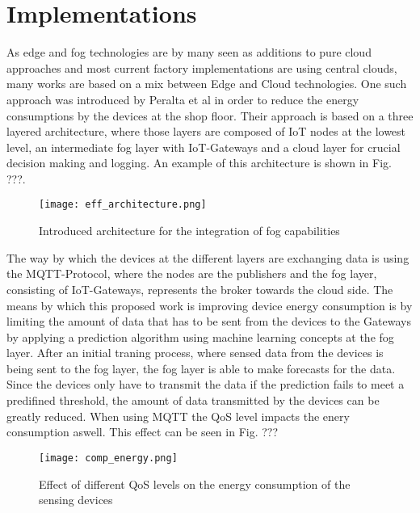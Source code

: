 \section{Implementations}\label{sec:Implementation}

As edge and fog technologies are by many seen as additions to pure cloud approaches and most current factory implementations are using central clouds, many works are based on a mix between Edge and Cloud technologies. One such approach was introduced by Peralta et al in order to reduce the energy consumptions by the devices at the shop floor. Their approach is based on a three layered architecture, where those layers are composed of IoT nodes at the lowest level, an intermediate fog layer with IoT-Gateways and a cloud layer for crucial decision making and logging. An example of this architecture is shown in Fig. ???. 

\begin{figure}
	\centering
	\texttt{[image: eff\_architecture.png]}
	\caption{Introduced architecture for the integration of fog capabilities}
\end{figure}  

The way by which the devices at the different layers are exchanging data is using the MQTT-Protocol, where the nodes are the publishers and the fog layer, consisting of IoT-Gateways, represents the broker towards the cloud side. The means by which this proposed work is improving device energy consumption is by limiting the amount of data that has to be sent from the devices to the Gateways by applying a prediction algorithm using machine learning concepts at the fog layer. After an initial traning process, where sensed data from the devices is being sent to the fog layer, the fog layer is able to make forecasts for the data. Since the devices only have to transmit the data if the prediction fails to meet a predifined threshold, the amount of data transmitted by the devices can be greatly reduced. When using MQTT the QoS level impacts the enery consumption aswell. This effect can be seen in Fig. ???

\begin{figure}
	\centering
	\texttt{[image: comp\_energy.png]}
	\caption{Effect of different QoS levels on the energy consumption of the sensing devices}
\end{figure}

